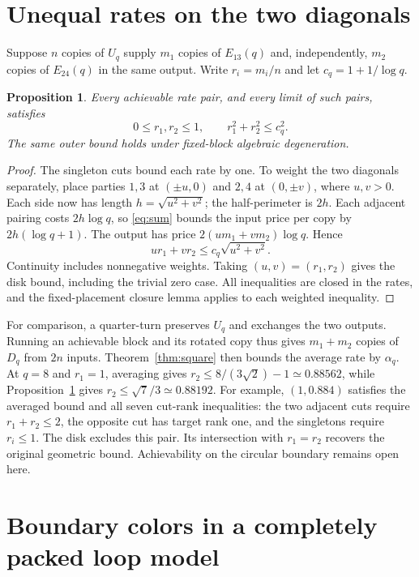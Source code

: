 \documentclass[11pt]{article}
\newtheorem{proposition}[theorem]{Proposition}
\begin{document}
\section{Unequal rates on the two diagonals}

Suppose \(n\) copies of \(U_q\) supply \(m_1\) copies of \(E_{13}(q)\)
and, independently, \(m_2\) copies of \(E_{24}(q)\) in the same output.
Write \(r_i=m_i/n\) and let \(c_q=1+1/\log q\).

\begin{proposition}\label{prop:disk}
Every achievable rate pair, and every limit of such pairs, satisfies
\[
 0\le r_1,r_2\le 1,\qquad r_1^2+r_2^2\le c_q^2 .
\]
The same outer bound holds under fixed-block algebraic degeneration.
\end{proposition}

\begin{proof}
The singleton cuts bound each rate by one. To weight the two diagonals
separately, place parties \(1,3\) at \((\pm u,0)\) and \(2,4\) at
\((0,\pm v)\), where \(u,v>0\). Each side now has length
\(h=\sqrt{u^2+v^2}\); the half-perimeter is \(2h\).
Each adjacent pairing costs \(2h\log q\), so \eqref{eq:sum} bounds the
input price per copy by \(2h(\log q+1)\). The output has price
\(2(um_1+vm_2)\log q\). Hence
\[
 u r_1+v r_2\le c_q\sqrt{u^2+v^2}.
\]
Continuity includes nonnegative weights. Taking \((u,v)=(r_1,r_2)\)
gives the disk bound, including the trivial zero case. All inequalities
are closed in the rates, and the fixed-placement closure lemma applies
to each weighted inequality.
\end{proof}

For comparison, a quarter-turn preserves \(U_q\) and exchanges the two
outputs. Running an achievable block and its rotated copy thus gives
\(m_1+m_2\) copies of \(D_q\) from \(2n\) inputs. Theorem~\ref{thm:square}
then bounds the average rate by \(\alpha_q\).
At \(q=8\) and \(r_1=1\), averaging gives
\(r_2\le 8/(3\sqrt2)-1\simeq0.88562\), while Proposition~\ref{prop:disk}
gives \(r_2\le\sqrt7/3\simeq0.88192\). For example, \((1,0.884)\)
satisfies the averaged bound and all seven cut-rank inequalities:
the two adjacent cuts require \(r_1+r_2\le2\), the opposite cut has
target rank one, and the singletons require \(r_i\le1\).
The disk excludes this pair. Its intersection with \(r_1=r_2\)
recovers the original geometric bound. Achievability on the circular
boundary remains open here.

\section{Boundary colors in a completely packed loop model}
\end{document}

